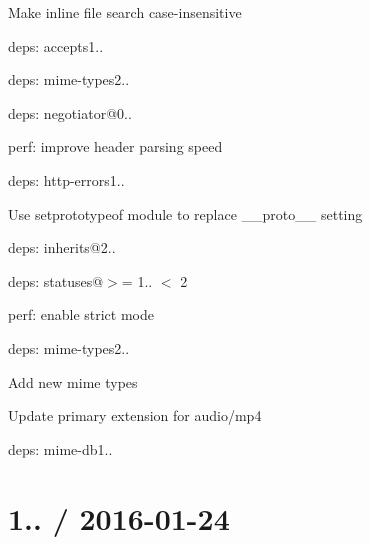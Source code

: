 \begin{DoxyItemize}
\item Make inline file search case-\/insensitive
\item deps\+: accepts1..
\begin{DoxyItemize}
\item deps\+: mime-\/types2..
\item deps\+: negotiator@0..
\item perf\+: improve header parsing speed
\end{DoxyItemize}
\item deps\+: http-\/errors1..
\begin{DoxyItemize}
\item Use {\ttfamily setprototypeof} module to replace {\ttfamily \+\_\+\+\_\+proto\+\_\+\+\_\+} setting
\item deps\+: inherits@2..
\item deps\+: statuses@\textquotesingle{}$>$= 1.. $<$ 2\textquotesingle{}
\item perf\+: enable strict mode
\end{DoxyItemize}
\item deps\+: mime-\/types2..
\begin{DoxyItemize}
\item Add new mime types
\item Update primary extension for {\ttfamily audio/mp4}
\item deps\+: mime-\/db1..
\end{DoxyItemize}
\end{DoxyItemize}

\section*{1.. / 2016-\/01-\/24 }


